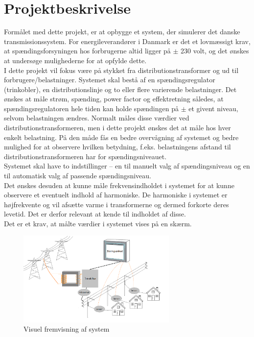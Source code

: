 
\chapter{Projektbeskrivelse}

Formålet med dette projekt, er at opbygge et system, der simulerer det danske transmissionssystem. For energileverandører i Danmark er det et lovmæssigt krav, at spændingsforsyningen hos forbrugerne altid ligger på $\pm$ 230 volt, og det ønskes at undersøge mulighederne for at opfylde dette.\\ 
I dette projekt vil fokus være på stykket fra distributionstransformer og ud til forbrugere/belastninger. Systemet skal bestå af en spændingsregulator (trinkobler), en distributionslinje og to eller flere varierende belastninger. Det ønskes at måle strøm, spænding, power factor og effektretning således, at spændingsregulatoren hele tiden kan holde spændingen på $\pm$ et givent niveau, selvom belastningen ændres. Normalt måles disse værdier ved distributionstransformeren, men i dette projekt ønskes det at måle hos hver enkelt belastning. På den måde fås en bedre overvågning af systemet og bedre mulighed for at observere hvilken betydning, f.eks. belastningens afstand til distributionstransformeren har for spændingsniveauet.\\ Systemet skal have to indstillinger – en til manuelt valg af spændingsniveau og en til automatisk valg af passende spændingsniveau.\\ 
Det ønskes desuden at kunne måle frekvensindholdet i systemet for at kunne observere et eventuelt indhold af harmoniske. De harmoniske i systemet er højfrekvente og vil afsætte varme i transformerne og dermed forkorte deres levetid. Det er derfor relevant at kende til indholdet af disse.\\ 
Det er et krav, at målte værdier i systemet vises på en skærm. 

\begin{figure}[htbp] %
	\centering
	\includegraphics[width=0.7\textwidth]{Figure/RigtBillede}
	\caption{Visuel fremvisning af system}
	\label{fig:Rigtbillede}
\end{figure}